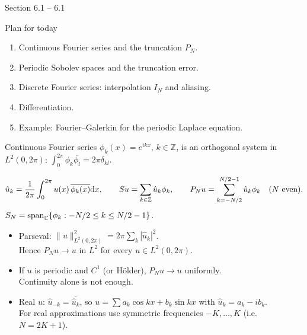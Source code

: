 
{Section 6.1}
{--}
{6.1}

\begin{frame}{Plan for today}
    \begin{enumerate}
        \item Continuous Fourier series and the truncation $P_N$.
        \item Periodic Sobolev spaces and the truncation error.
        \item Discrete Fourier series: interpolation $I_N$ and aliasing.
        \item Differentiation.
        \item Example: Fourier--Galerkin for the periodic Laplace equation.
    \end{enumerate}
    \bigskip
\end{frame}

\begin{frame}{Continuous Fourier series}
    $\phi_k(x) = e^{ikx}$, $k \in \mathbb Z$, is an orthogonal system in $L^2(0,2\pi)$:
    \(
    \int_0^{2\pi} \phi_k \overline{\phi_l} = 2\pi\delta_{kl}.
    \)
    \begin{definition}
        \vspace{-\abovedisplayskip}
        \[
            \hat u_k = \frac{1}{2\pi} \int_0^{2\pi} u(x)\, \overline{\phi_k(x)} {\mathrm d} x,
            \qquad
            Su = \sum_{k \in \mathbb Z} \hat u_k \phi_k,
            \qquad
            P_N u = \sum_{k = -N/2}^{N/2 - 1} \hat u_k \phi_k \quad (N \text{ even}).
        \]
        $S_N = \operatorname{span}_{\mathbb C}\{\phi_k : -N/2 \le k \le N/2 - 1\}$.
    \end{definition}
    \begin{itemize}
        \item Parseval: $\|u\|^2_{L^2(0,2\pi)} = 2\pi \sum_k |\hat u_k|^2$.\\ Hence $P_N u \to u$ in $L^2$ for every $u \in L^2(0,2\pi)$.
        \item If $u$ is periodic and $C^1$ (or Hölder), $P_N u \to u$ uniformly.\\ Continuity alone is not enough.
        \item Real $u$: $\hat u_{-k} = \overline{\hat u_k}$, so $u = \sum a_k \cos kx + b_k \sin kx$ with $\hat u_k = a_k - i b_k$.\\
              For real approximations use symmetric frequencies $-K, \dots, K$ (i.e.\ $N = 2K+1$).
    \end{itemize}
\end{frame}

